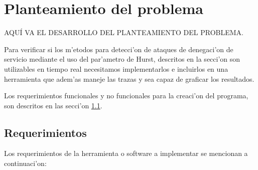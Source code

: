 \chapter{Planteamiento del problema} \label{chap:planning}


AQU\'I VA EL DESARROLLO DEL PLANTEAMIENTO DEL PROBLEMA.
\vspace{5 mm}

Para verificar si los m'etodos para detecci'on de ataques de denegaci'on de
servicio mediante el uso del par'ametro de Hurst, descritos en la secci'on
son utilizables en tiempo real necesitamos implementarlos e incluirlos en 
una herramienta que adem'as maneje las trazas y sea capaz de graficar los resultados. 

Los requerimientos funcionales y no funcionales para la creaci'on del programa,
son descritos en las secci'on \ref{sect:requirements}. 

\section{Requerimientos} \label{sect:requirements}

Los requerimientos de la herramienta o software a implementar se mencionan a
continuaci'on: 


